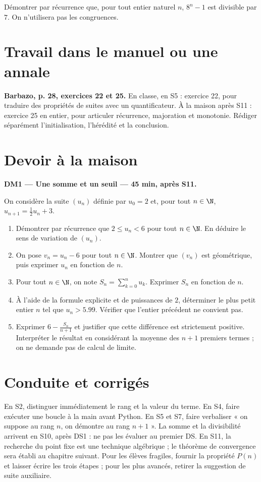 Démontrer par récurrence que, pour tout entier naturel $n$, $8^n-1$ est divisible par $7$. On n'utilisera pas les congruences.

\section{Travail dans le manuel ou une annale}\textbf{Barbazo, p. 28, exercices 22 et 25.} En classe, en S5 : exercice 22, pour traduire des propriétés de suites avec un quantificateur. À la maison après S11 : exercice 25 en entier, pour articuler récurrence, majoration et monotonie. Rédiger séparément l'initialisation, l'hérédité et la conclusion.

\mxnewpage
\section{Devoir à la maison}\textbf{DM1 --- Une somme et un seuil --- 45 min, après S11.}\par On considère la suite $(u_n)$ définie par $u_0=2$ et, pour tout $n\in\N$, $u_{n+1}=\frac12u_n+3$.
\begin{enumerate}\item Démontrer par récurrence que $2\le u_n<6$ pour tout $n\in\N$. En déduire le sens de variation de $(u_n)$.
\item On pose $v_n=u_n-6$ pour tout $n\in\N$. Montrer que $(v_n)$ est géométrique, puis exprimer $u_n$ en fonction de $n$.
\item Pour tout $n\in\N$, on note $S_n=\displaystyle\sum_{k=0}^n u_k$. Exprimer $S_n$ en fonction de $n$.
\item À l'aide de la formule explicite et de puissances de $2$, déterminer le plus petit entier $n$ tel que $u_n>\num{5,99}$. Vérifier que l'entier précédent ne convient pas.
\item Exprimer $6-\frac{S_n}{n+1}$ et justifier que cette différence est strictement positive. Interpréter le résultat en considérant la moyenne des $n+1$ premiers termes ; on ne demande pas de calcul de limite.\end{enumerate}

\ifmxteacher\mxnewpage\section{Conduite et corrigés}\begin{teachernote}En S2, distinguer immédiatement le rang et la valeur du terme. En S4, faire exécuter une boucle à la main avant Python. En S5 et S7, faire verbaliser « on suppose au rang $n$, on démontre au rang $n+1$ ». La somme et la divisibilité arrivent en S10, après DS1 : ne pas les évaluer au premier DS. En S11, la recherche du point fixe est une technique algébrique ; le théorème de convergence sera établi au chapitre suivant. Pour les élèves fragiles, fournir la propriété $P(n)$ et laisser écrire les trois étapes ; pour les plus avancés, retirer la suggestion de suite auxiliaire.\end{teachernote}

